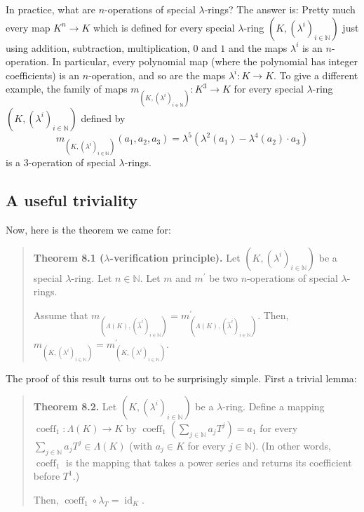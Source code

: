 \documentclass[numbers=enddot,12pt,final,onecolumn,notitlepage]{scrartcl}%
\begin{document}
In practice, what are $n$-operations of special $\lambda$-rings? The answer
is: Pretty much every map $K^{n}\rightarrow K$ which is defined for every
special $\lambda$-ring $\left(  K,\left(  \lambda^{i}\right)  _{i\in
\mathbb{N}}\right)  $ just using addition, subtraction, multiplication, $0$
and $1$ and the maps $\lambda^{i}$ is an $n$-operation. In particular, every
polynomial map (where the polynomial has integer coefficients) is an
$n$-operation, and so are the maps $\lambda^{i}:K\rightarrow K$. To give a
different example, the family of maps $m_{\left(  K,\left(  \lambda
^{i}\right)  _{i\in\mathbb{N}}\right)  }:K^{3}\rightarrow K$ for every special
$\lambda$-ring $\left(  K,\left(  \lambda^{i}\right)  _{i\in\mathbb{N}%
}\right)  $ defined by%
\[
m_{\left(  K,\left(  \lambda^{i}\right)  _{i\in\mathbb{N}}\right)  }\left(
a_{1},a_{2},a_{3}\right)  =\lambda^{5}\left(  \lambda^{2}\left(  a_{1}\right)
-\lambda^{4}\left(  a_{2}\right)  \cdot a_{3}\right)
\]
is a $3$-operation of special $\lambda$-rings.

\subsection{A useful triviality}

Now, here is the theorem we came for:

\begin{quote}
\textbf{Theorem 8.1 (}$\lambda$\textbf{-verification principle).} Let $\left(
K,\left(  \lambda^{i}\right)  _{i\in\mathbb{N}}\right)  $ be a special
$\lambda$-ring. Let $n\in\mathbb{N}$. Let $m$ and $m^{\prime}$ be two
$n$-operations of special $\lambda$-rings.

Assume that $m_{\left(  \Lambda\left(  K\right)  ,\left(  \widehat{\lambda
}^{i}\right)  _{i\in\mathbb{N}}\right)  }=m_{\left(  \Lambda\left(  K\right)
,\left(  \widehat{\lambda}^{i}\right)  _{i\in\mathbb{N}}\right)  }^{\prime}$.
Then, $m_{\left(  K,\left(  \lambda^{i}\right)  _{i\in\mathbb{N}}\right)
}=m_{\left(  K,\left(  \lambda^{i}\right)  _{i\in\mathbb{N}}\right)  }%
^{\prime}$.
\end{quote}

The proof of this result turns out to be surprisingly simple. First a trivial lemma:

\begin{quote}
\textbf{Theorem 8.2.} Let $\left(  K,\left(  \lambda^{i}\right)
_{i\in\mathbb{N}}\right)  $ be a $\lambda$-ring. Define a mapping
$\operatorname*{coeff}\nolimits_{1}:\Lambda\left(  K\right)  \rightarrow K$ by
$\operatorname*{coeff}\nolimits_{1}\left(  \sum\limits_{j\in\mathbb{N}}%
a_{j}T^{j}\right)  =a_{1}$ for every $\sum\limits_{j\in\mathbb{N}}a_{j}%
T^{j}\in\Lambda\left(  K\right)  $ (with $a_{j}\in K$ for every $j\in
\mathbb{N}$). (In other words, $\operatorname*{coeff}\nolimits_{1}$ is the
mapping that takes a power series and returns its coefficient before $T^{1}.$)

Then, $\operatorname*{coeff}\nolimits_{1}\circ\lambda_{T}=\operatorname*{id}%
_{K}$.
\end{quote}
\end{document}

